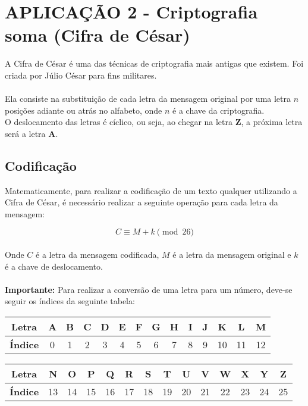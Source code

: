 \section{APLICAÇÃO 2 - Criptografia soma (Cifra de César)}
A Cifra de César é uma das técnicas de criptografia mais antigas que existem. Foi criada por Júlio César para fins militares.\\\\
Ela consiste na substituição de cada letra da mensagem original por uma letra $n$ posições adiante ou atrás no alfabeto, onde $n$ é a chave da criptografia.\\
O deslocamento das letras é cíclico, ou seja, ao chegar na letra \textbf{Z}, a próxima letra será a letra \textbf{A}.

\subsection{Codificação}
Matematicamente, para realizar a codificação de um texto qualquer utilizando a Cifra de César, é necessário realizar a seguinte operação para cada letra da mensagem:

\[
    C \equiv M + k \pmod{26}
\]\\
Onde $C$ é a letra da mensagem codificada, $M$ é a letra da mensagem original e $k$ é a chave de deslocamento.\\\\
\textbf{Importante:} Para realizar a conversão de uma letra para um número, deve-se seguir os índices da seguinte tabela:

\begin{center}
    \begin{tabular}{|c|c|c|c|c|c|c|c|c|c|c|c|c|c|}
        \hline
        \textbf{Letra}  & \textbf{A} & \textbf{B} & \textbf{C} & \textbf{D} & \textbf{E} & \textbf{F} & \textbf{G} & \textbf{H} & \textbf{I} & \textbf{J} & \textbf{K} & \textbf{L} & \textbf{M} \\
        \hline
        \textbf{Índice} & 0          & 1          & 2          & 3          & 4          & 5          & 6          & 7          & 8          & 9          & 10         & 11         & 12         \\
        \hline
    \end{tabular}
\end{center}
\begin{center}
    \begin{tabular}{|c|c|c|c|c|c|c|c|c|c|c|c|c|c|}
        \hline
        \textbf{Letra}  & \textbf{N} & \textbf{O} & \textbf{P} & \textbf{Q} & \textbf{R} & \textbf{S} & \textbf{T} & \textbf{U} & \textbf{V} & \textbf{W} & \textbf{X} & \textbf{Y} & \textbf{Z} \\
        \hline
        \textbf{Índice} & 13         & 14         & 15         & 16         & 17         & 18         & 19         & 20         & 21         & 22         & 23         & 24         & 25         \\
        \hline
    \end{tabular}
\end{center}

